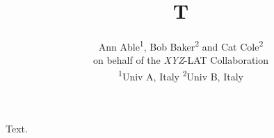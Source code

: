 \documentclass{article}
\providecommand\IEEEauthorblockN[1]{#1}
\providecommand\IEEEauthorblockA[1]{#1}
\providecommand\IEEEauthorrefmark[1]{\textsuperscript{#1}}
\begin{document}
\title{T}
\author{\IEEEauthorblockN{Ann Able\IEEEauthorrefmark{1},
  Bob Baker\IEEEauthorrefmark{2} and
  Cat Cole\IEEEauthorrefmark{2}\\on behalf of the \emph{XYZ}-LAT Collaboration}
  \\
\IEEEauthorblockA{\IEEEauthorrefmark{1}Univ A, Italy} \IEEEauthorblockA{\IEEEauthorrefmark{2}Univ B, Italy}}
\maketitle
Text.
\end{document}
